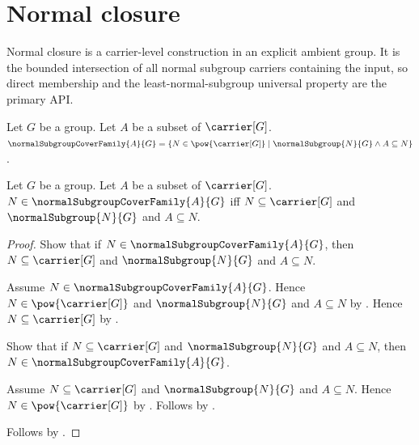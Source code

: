 


\section{Normal closure}

Normal closure is a carrier-level construction in an explicit ambient group.
It is the bounded intersection of all normal subgroup carriers containing the
input, so direct membership and the least-normal-subgroup universal property
are the primary API.

\begin{definition}\label{normal_subgroup_cover_family}
    Let $G$ be a group.
    Let $A$ be a subset of $\carrier[G]$.
    $\normalSubgroupCoverFamily{A}{G}=
        \{N\in\pow{\carrier[G]}\mid
            \normalSubgroup{N}{G}\land A\subseteq N\}$.
\end{definition}

\begin{proposition}\label{normal_subgroup_cover_family_iff}
    Let $G$ be a group.
    Let $A$ be a subset of $\carrier[G]$.
    $N\in\normalSubgroupCoverFamily{A}{G}$ iff
        $N\subseteq\carrier[G]$ and
        $\normalSubgroup{N}{G}$ and
        $A\subseteq N$.
\end{proposition}
\begin{proof}
    Show that if $N\in\normalSubgroupCoverFamily{A}{G}$, then
        $N\subseteq\carrier[G]$ and
        $\normalSubgroup{N}{G}$ and $A\subseteq N$.
    \begin{subproof}
        Assume $N\in\normalSubgroupCoverFamily{A}{G}$.
        Hence $N\in\pow{\carrier[G]}$ and
            $\normalSubgroup{N}{G}$ and $A\subseteq N$ by
            .
        Hence $N\subseteq\carrier[G]$ by
            .
    \end{subproof}
    Show that if $N\subseteq\carrier[G]$ and
        $\normalSubgroup{N}{G}$ and $A\subseteq N$, then
        $N\in\normalSubgroupCoverFamily{A}{G}$.
    \begin{subproof}
        Assume $N\subseteq\carrier[G]$ and
            $\normalSubgroup{N}{G}$ and $A\subseteq N$.
        Hence $N\in\pow{\carrier[G]}$ by
            .
        Follows by .
    \end{subproof}
    Follows by \auto.
\end{proof}

